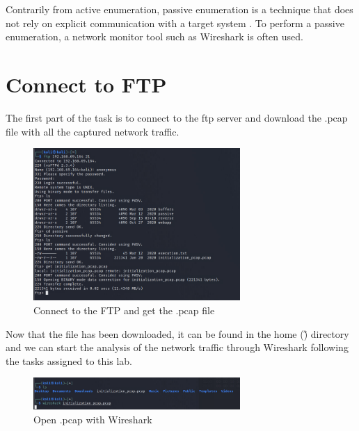 Contrarily from active enumeration, passive enumeration is a technique that does
not rely on explicit communication with a target system
\citep{cooperWhatDifferenceActive2020}. To perform a passive enumeration, a
network monitor tool such as Wireshark is often used.

\section{Connect to FTP}
\label{s:Connect-To-FTP}
The first part of the task is to connect to the ftp server and download the .pcap
file with all the captured network traffic.

\begin{figure}[ht]
  \centering
  \includegraphics[width=0.7\textwidth]{figures/ftp-get-pcap}
  \caption{Connect to the FTP and get the .pcap file}
  \label{f:ftp-get-pcap}
\end{figure}

Now that the file has been downloaded, it can be found in the home (\~) directory
and we can start the analysis of the network traffic through Wireshark following the
tasks assigned to this lab.
\begin{figure}[ht]
  \centering
  \includegraphics[width=0.7\textwidth]{figures/wireshark-pcap}
  \caption{Open .pcap with Wireshark}
  \label{f:wireshark-pcap}
\end{figure}

